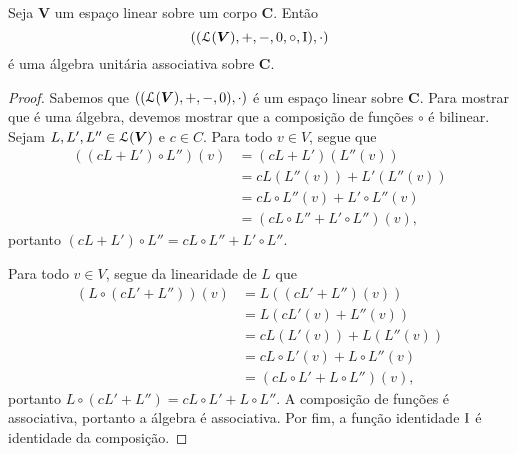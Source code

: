 \begin{proposition}
Seja $\bm V$ um espaço linear sobre um corpo $\bm C$. Então
	\begin{equation*}
	((\mathcal{L}(\bm V),+,-,0,\circ,\mathrm{I}),\cdot)
	\end{equation*}
é uma álgebra unitária associativa sobre $\bm C$.
\end{proposition}
\begin{proof}
Sabemos que $((\mathcal{L}(\bm V),+,-,0),\cdot)$ é um espaço linear sobre $\bm C$. Para mostrar que é uma álgebra, devemos mostrar que a composição de funções $\circ$ é bilinear. Sejam $L,L',L'' \in \mathcal{L}(\bm V)$ e $c \in C$. Para todo $v \in V$, segue que
	\begin{align*}
	((cL+L') \circ L'')(v) &= (cL+L')(L''(v)) \\
		&= cL(L''(v))+L'(L''(v)) \\
		&= cL \circ L''(v) + L' \circ L''(v) \\
		&= (cL \circ L'' + L' \circ L'')(v),
	\end{align*}
portanto $(cL+L') \circ L'' = cL \circ L'' + L' \circ L''$.

Para todo $v \in V$, segue da linearidade de $L$ que
	\begin{align*}
	(L \circ (cL'+L''))(v) &= L((cL'+L'')(v)) \\
		&= L(cL'(v)+L''(v)) \\
		&= cL(L'(v))+L(L''(v)) \\
		&= cL \circ L'(v)+L \circ L''(v) \\
		&= (cL \circ L' + L \circ L'')(v),
	\end{align*}
portanto $L \circ (cL'+L'') = cL \circ L' + L \circ L''$. A composição de funções é associativa, portanto a álgebra é associativa. Por fim, a função identidade $\mathrm{I}$ é identidade da composição.
\end{proof}

